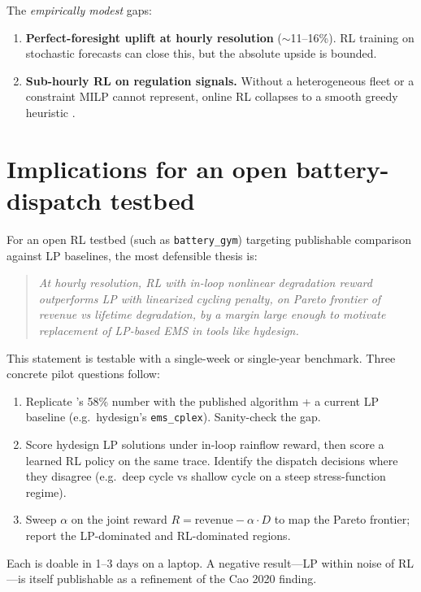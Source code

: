 \documentclass[11pt]{article}
\begin{document}
The \emph{empirically modest} gaps:

\begin{enumerate}
\item \textbf{Perfect-foresight uplift at hourly resolution} (\(\sim\)11--16\%). RL training on stochastic forecasts can close this, but the absolute upside is bounded.
\item \textbf{Sub-hourly RL on regulation signals.} Without a heterogeneous fleet or a constraint MILP cannot represent, online RL collapses to a smooth greedy heuristic \citep{srinivasa2026degradation}.
\end{enumerate}

\section{Implications for an open battery-dispatch testbed}

For an open RL testbed (such as \texttt{battery\_gym}) targeting publishable comparison against LP baselines, the most defensible thesis is:

\begin{quote}
\itshape
At hourly resolution, RL with in-loop nonlinear degradation reward outperforms LP with linearized cycling penalty, on Pareto frontier of revenue vs lifetime degradation, by a margin large enough to motivate replacement of LP-based EMS in tools like hydesign.
\end{quote}

This statement is testable with a single-week or single-year benchmark. Three concrete pilot questions follow:

\begin{enumerate}
\item Replicate \citet{cao2020drl}'s 58\% number with the published algorithm + a current LP baseline (e.g.\ hydesign's \texttt{ems\_cplex}). Sanity-check the gap.
\item Score hydesign LP solutions under in-loop rainflow reward, then score a learned RL policy on the same trace. Identify the dispatch decisions where they disagree (e.g.\ deep cycle vs shallow cycle on a steep stress-function regime).
\item Sweep $\alpha$ on the joint reward $R = \text{revenue} - \alpha \cdot D$ to map the Pareto frontier; report the LP-dominated and RL-dominated regions.
\end{enumerate}

Each is doable in 1--3 days on a laptop. A negative result---LP within noise of RL---is itself publishable as a refinement of the Cao 2020 finding.
\end{document}
